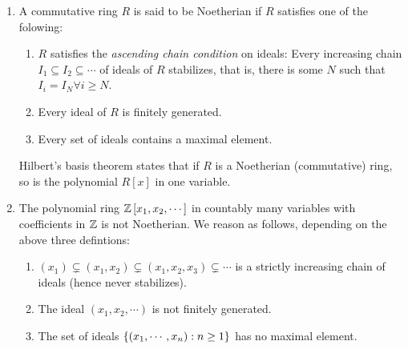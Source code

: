 \begin{sol}
\begin{enumerate}[label=(\alph*)]
\item A commutative ring $R$ is said to be Noetherian if $R$ satisfies one of the folowing:
\begin{enumerate}[label=(\roman*)]
	\item $R$ satisfies the \textit{ascending chain condition} on ideals: Every increasing chain  $I_1\subseteq I_2\subseteq\cdots$ of ideals of $R$ stabilizes, that is, there is some $N$ such that $I_i = I_N\forall i\geq N$.
	\item Every ideal of $R$ is finitely generated.
	\item Every set of ideals contains a maximal element.
\end{enumerate}
Hilbert's basis theorem states that if $R$ is a Noetherian (commutative) ring, so is the polynomial $R[x]$ in one variable.
\item The polynomial ring $\mathbb{Z}\left[x_1,x_2,\cdots\right]$ in countably many variables with coefficients in $\mathbb{Z}$ is not Noetherian. We reason as follows, depending on the above three defintions:
\begin{enumerate}[label=(\roman*)]
	\item $\left(x_1\right) \subsetneq \left(x_1,x_2\right)\subsetneq \left(x_1,x_2,x_3\right)\subsetneq \cdots$ is a strictly increasing chain of ideals (hence never stabilizes).
	\item The ideal $\left(x_1,x_2,\cdots\right)$ is not finitely generated.
	\item The set of ideals $\left\{\left(x_1,\cdots,x_n\right): n\geq 1\right\}$ has no maximal element.
\end{enumerate}
\end{enumerate}
\end{sol}